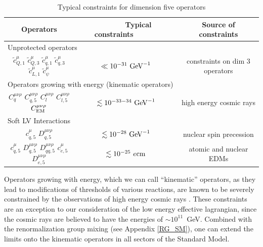 \documentclass[12pt,preprintnumbers,nofootinbib]{revtex4}
\newcommand{\wt}{\widetilde}
\newcommand{\el}{{\rm EM}}
\begin{document}
\begin{table}[tb]
\label{constr_table}
\caption{Typical constraints for dimension five operators}
\begin{tabular}{|ccc|}
\hline
	\multicolumn{1}{|c|}{Operators} & 
	\multicolumn{1}{|c|}{~~~~~~Typical constraints~~~~~~} & 
	\multicolumn{1}{|c|}{Source of constraints} \\
\hline
	\multicolumn{3}{|l|}{\quad Unprotected operators} \\
\hline
	$ \wt{c}_{Q,1}^\mu  $
	$ \wt{c}_{Q,3}^\mu  $
	$ \wt{c}_{q,1}^\mu  $
	$ \wt{c}_{q,3}^\mu  $
	$ \wt{c}_{L,1}^\mu  $
	$ \wt{c}_{\psi}^\mu $  &
	$ \ll 10^{-31}~{\rm GeV}^{-1} $ &
	constraints on dim 3 operators
	\\
\hline
	\multicolumn{3}{|l|}{\quad Operators growing with energy (kinematic operators)} \\
\hline
	$ C_{q}^{\mu\nu\rho} $ $ C_{q,5}^{\mu\nu\rho} $
	$ C_l^{\mu\nu\rho} $  $ C_{l,5}^{\mu\nu\rho} $
	$ C^{\mu\nu\rho}_\el $ &
	$ \lesssim 10^{-33-34}~{\rm GeV}^{-1} $
	&
	high energy cosmic rays
	\\
\hline
	\multicolumn{3}{|l|}{\quad Soft LV Interactions} \\
\hline
	$ c^\mu_{q,5} $ $ D^{\mu\nu\rho}_{q,5} $ &
	$ \lesssim 10^{-28}~{\rm GeV}^{-1} $     &
	nuclear spin precession \\
\hline
	$ c^\mu_{q,5} $ $ D^{\mu\nu\rho}_{q,5} $ 
	$ D^{\mu\nu\rho}_{qq,5} $ 
	$ c^\mu_{e,5} $ $ D^{\mu\nu\rho}_{e,5} $ &
	$ \lesssim 10^{-25}~e{\rm cm} $          &
	atomic and nuclear EDMs \\
\hline
\end{tabular}
\end{table}
	
	Operators growing with energy, which we can call ``kinematic'' operators,
	as they lead to modifications of thresholds of various reactions, are 
	known to be severely constrained by the
	observations of high energy cosmic rays 
\cite{Gagnon:2004xh}.
	These constraints are an exception to our consideration of the low energy 
	effective lagrangian, since the cosmic rays are believed to have the
	energies of $ \sim 10^{11} $~GeV.
	Combined with the renormalization group mixing
	(see Appendix \ref{RG_SM}), one can extend
	the limits onto the kinematic operators in all sectors of the Standard Model.
	
\end{document}
